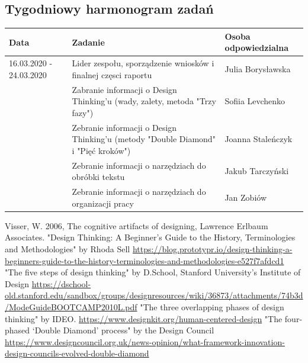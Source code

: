 \documentclass[a4paper,titleauthor]{mwart}
\begin{document}
\subsection{Tygodniowy harmonogram zadań}



\begin{tabular}{|p{2cm}|p{9cm}|p{3.5cm}|} \hline
Data & Zadanie & Osoba odpowiedzialna \\
\hline
16.03.2020 - 24.03.2020 & Lider zespołu, sporządzenie wniosków  i finalnej częsci raportu & Julia Borysławska \\
\hline
 & Zabranie informacji o Design Thinking'u (wady, zalety, metoda "Trzy fazy") & Sofiia Levchenko\\
\hline
& Zebranie informacji o Design Thinking'u (metody "Double Diamond" i "Pięć kroków") & Joanna Staleńczyk \\
\hline
& Zebranie informacji o narzędziach do obróbki tekstu & Jakub Tarczyński \\
\hline
& Zebranie informacji o narzędziach do organizacji pracy  & Jan Zobiów \\ 

\hline

\end{tabular}





\begin{thebibliography}{SYCYfProjekt}
 Visser, W. 2006, The cognitive artifacts of designing, Lawrence Erlbaum Associates.
"Design Thinking: A Beginner’s Guide to the History, Terminologies and Methodologies" by Rhoda Sell \url{https://blog.prototypr.io/design-thinking-a-beginners-guide-to-the-history-terminologies-and-methodologies-e527f7afdcd1}
"The five steps of design thinking" by D.School, Stanford University’s Institute of Design \url{https://dschool-old.stanford.edu/sandbox/groups/designresources/wiki/36873/attachments/74b3d/ModeGuideBOOTCAMP2010L.pdf}
"The three overlapping phases of design thinking" by IDEO. \url{https://www.designkit.org/human-centered-design}
"The four-phased ‘Double Diamond’ process" by the Design Council \url{https://www.designcouncil.org.uk/news-opinion/what-framework-innovation-design-councils-evolved-double-diamond}
\end{thebibliography}
\end{document}
